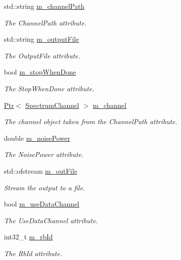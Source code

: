\begin{DoxyCompactItemize}
std\+::string \hyperlink{classns3_1_1RadioEnvironmentMapHelper_ad059b7a091d9438c3c7539f122cd3070}{m\+\_\+channel\+Path}
\begin{DoxyCompactList}\small\item\em The {\ttfamily Channel\+Path} attribute. \end{DoxyCompactList}\item 
std\+::string \hyperlink{classns3_1_1RadioEnvironmentMapHelper_a4ed6a97a3aa3011388fdc771af50ae66}{m\+\_\+output\+File}
\begin{DoxyCompactList}\small\item\em The {\ttfamily Output\+File} attribute. \end{DoxyCompactList}\item 
bool \hyperlink{classns3_1_1RadioEnvironmentMapHelper_afe704d7c118eec931eb586fdef6f6382}{m\+\_\+stop\+When\+Done}
\begin{DoxyCompactList}\small\item\em The {\ttfamily Stop\+When\+Done} attribute. \end{DoxyCompactList}\item 
\hyperlink{classns3_1_1Ptr}{Ptr}$<$ \hyperlink{classns3_1_1SpectrumChannel}{Spectrum\+Channel} $>$ \hyperlink{classns3_1_1RadioEnvironmentMapHelper_a38de708dbd18e8ee576c36bdb78f9fce}{m\+\_\+channel}
\begin{DoxyCompactList}\small\item\em The channel object taken from the {\ttfamily Channel\+Path} attribute. \end{DoxyCompactList}\item 
double \hyperlink{classns3_1_1RadioEnvironmentMapHelper_a53457bd86b23a6772f9bcf03d93e9de8}{m\+\_\+noise\+Power}
\begin{DoxyCompactList}\small\item\em The {\ttfamily Noise\+Power} attribute. \end{DoxyCompactList}\item 
std\+::ofstream \hyperlink{classns3_1_1RadioEnvironmentMapHelper_a45c9b89a57a284c32357a82602d7cfa8}{m\+\_\+out\+File}
\begin{DoxyCompactList}\small\item\em Stream the output to a file. \end{DoxyCompactList}\item 
bool \hyperlink{classns3_1_1RadioEnvironmentMapHelper_a498cc85b6a5abb1eee18c95274963c45}{m\+\_\+use\+Data\+Channel}
\begin{DoxyCompactList}\small\item\em The {\ttfamily Use\+Data\+Channel} attribute. \end{DoxyCompactList}\item 
int32\+\_\+t \hyperlink{classns3_1_1RadioEnvironmentMapHelper_a380539755840ad027fadec5d78b58ae5}{m\+\_\+rb\+Id}
\begin{DoxyCompactList}\small\item\em The {\ttfamily Rb\+Id} attribute. \end{DoxyCompactList}\end{DoxyCompactItemize}
